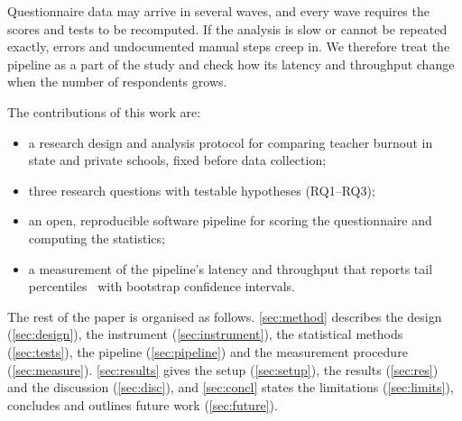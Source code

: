 Questionnaire data may arrive in several waves, and every wave requires the
scores and tests to be recomputed. If the analysis is slow or cannot be repeated
exactly, errors and undocumented manual steps creep in. We therefore treat the
pipeline as a part of the study and check how its latency and throughput change
when the number of respondents grows.

The contributions of this work are:
\begin{itemize}
  \item a research design and analysis protocol for comparing teacher burnout
        in state and private schools, fixed before data collection;
  \item three research questions with testable hypotheses (RQ1--RQ3);
  \item an open, reproducible software pipeline for scoring the questionnaire
        and computing the statistics;
  \item a measurement of the pipeline's latency and throughput that reports
        tail percentiles~\cite{dean2013tail} with bootstrap confidence intervals.
\end{itemize}

The rest of the paper is organised as follows. \autoref{sec:method} describes
the design (\autoref{sec:design}), the instrument (\autoref{sec:instrument}), the
statistical methods (\autoref{sec:tests}), the pipeline (\autoref{sec:pipeline}) and
the measurement procedure (\autoref{sec:measure}). \autoref{sec:results} gives the
setup (\autoref{sec:setup}), the results (\autoref{sec:res}) and the discussion
(\autoref{sec:disc}), and \autoref{sec:concl} states the limitations
(\autoref{sec:limits}), concludes and outlines future work (\autoref{sec:future}).
